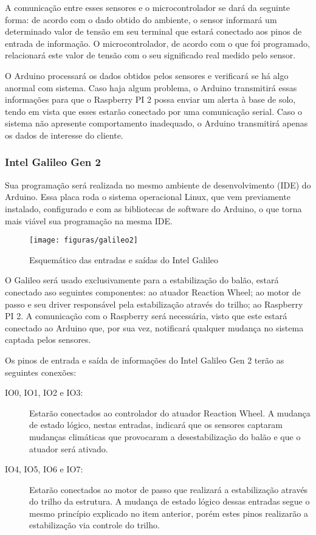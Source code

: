 		A comunicação entre esses sensores e o microcontrolador se dará da seguinte forma: de acordo com o dado obtido do ambiente, o sensor informará um determinado valor de tensão em seu terminal que estará conectado aos pinos de entrada de informação. O microcontrolador, de acordo com o que foi programado, relacionará este valor de tensão com o seu significado real medido pelo sensor.

		O Arduino processará os dados obtidos pelos sensores e verificará se há algo anormal com sistema. Caso haja algum problema, o Arduino transmitirá essas informações para que o Raspberry PI 2 possa enviar um alerta à base de solo, tendo em vista que esses estarão conectado por uma comunicação serial. Caso o sistema não apresente comportamento inadequado, o Arduino transmitirá apenas os dados de interesse do cliente.

	\subsubsection{Intel Galileo Gen 2}

		Sua programação será realizada no mesmo ambiente de desenvolvimento (IDE) do Arduino. Essa placa roda o sistema operacional Linux, que vem previamente instalado, configurado e com as bibliotecas de software do Arduino, o que torna mais viável sua programação na mesma IDE.~\cite{embarcados3}

		\begin{figure}[H]
			\centering
			\caption[Esquemático das entradas e saídas do Intel Galileo]{Esquemático das entradas e saídas do Intel Galileo~\cite{embarcados3}}
			\label{img:galileo2}
			\texttt{[image: figuras/galileo2]}
		\end{figure}

		O Galileo será usado exclusivamente para a estabilização do balão, estará conectado aso seguintes componentes:  ao atuador Reaction Wheel; ao motor de passo e seu driver responsável pela estabilização através do trilho; ao Raspberry PI 2. A comunicação com o Raspberry será necessária, visto que este estará conectado ao Arduino que, por sua vez, notificará qualquer mudança no sistema captada pelos sensores.

		Os pinos de entrada e saída de informações do Intel Galileo Gen 2 terão as seguintes conexões:
		\begin{description}
			\item[IO0, IO1, IO2 e IO3:] Estarão conectados ao controlador do atuador Reaction Wheel. A mudança de estado lógico, nestas entradas, indicará que os sensores captaram mudanças climáticas que provocaram a desestabilização do balão e que o atuador será ativado.
			\item[IO4, IO5, IO6 e IO7:] Estarão conectados ao motor de passo que realizará a estabilização através do trilho da estrutura. A mudança de estado lógico dessas entradas segue o mesmo princípio explicado no item anterior, porém estes pinos realizarão a estabilização via controle do trilho.
		\end{description}

